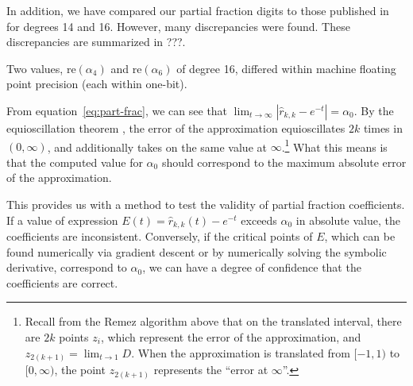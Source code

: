 
In addition, we have compared our partial fraction digits to those published
in~\cite{pusa2012correction} for degrees 14 and 16. However, many
discrepancies were found. These discrepancies are summarized in {\color{red}
  ???}.

Two values, $\mathrm{re}(\alpha_4)$ and $\mathrm{re}(\alpha_6)$ of degree
16, differed within machine floating point precision (each within one-bit).

From equation~\ref{eq:part-frac}, we can see that
$\lim_{t\to\infty}{\left|\hat{r}_{k,k} - e^{-t}\right|} = \alpha_0$. By the
equioscillation theorem , the error of the approximation equioscillates $2k$ times
in $(0, \infty)$, and additionally takes on the same value at $\infty$.\footnote{Recall
from the Remez algorithm above that on the translated interval, there are $2k$
points $z_i$, which represent the error of the approximation, and
$z_{2(k+1)}=\lim_{t\to 1}{D}$. When the approximation is translated from $[-1,
1)$ to $[0, \infty)$, the point $z_{2(k + 1)}$ represents the ``error at
$\infty$''.} What this means is that the computed value for $\alpha_0$ should
correspond to the maximum absolute error of the approximation.

This provides us with a method to test the validity of partial fraction
coefficients. If a value of expression $E(t) = \hat{r}_{k,k}(t) - e^{-t}$
exceeds $\alpha_0$ in absolute value, the coefficients are inconsistent.
Conversely, if the critical points of $E$, which can be found numerically via
gradient descent or by numerically solving the symbolic derivative, correspond
to $\alpha_0$, we can have a degree of confidence that the coefficients are
correct.
